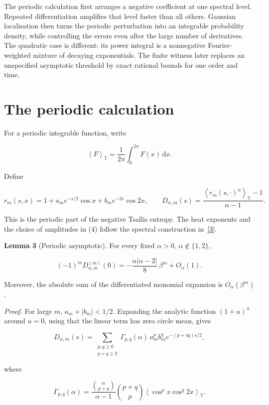 \documentclass[
  11pt,
]{article}
\begin{document}
The periodic calculation first arranges a negative coefficient at one
spectral level. Repeated differentiation amplifies that level faster
than all others. Gaussian localisation then turns the periodic
perturbation into an integrable probability density, while controlling
the errors even after the large number of derivatives. The quadratic
case is different: its power integral is a nonnegative Fourier-weighted
mixture of decaying exponentials. The finite witness later replaces an
unspecified asymptotic threshold by exact rational bounds for one order
and time.

\section{The periodic calculation}\label{the-periodic-calculation}

For a periodic integrable function, write

\[
\left\langle F\right\rangle_{\mathbb T}=\frac1{2\pi}\int_0^{2\pi}F(x)\,\mathrm dx.
\]

Define

\[
\tag{9}
 r_m(s,x)=1+a_me^{-s/2}\cos x+b_me^{-2s}\cos2x,
 \qquad
 D_{\alpha,m}(s)=\frac{\left\langle r_m(s,\cdot)^\alpha\right\rangle_{\mathbb T}-1}{\alpha-1}.
\]

This is the periodic part of the negative Tsallis entropy. The heat
exponents and the choice of amplitudes in (4) follow the spectral
construction in~\href{https://arxiv.org/abs/2608.30275v1}{{[}3{]}}.

\textbf{Lemma 3} (Periodic asymptotic). For every fixed \(\alpha>0\),
\(\alpha\notin\{1,2\}\),

\[
\tag{10}
 (-1)^mD_{\alpha,m}^{(m)}(0)
 =-\frac{\alpha|\alpha-2|}{8}\,\beta^m+O_\alpha(1).
\]

Moreover, the absolute sum of the differentiated monomial expansion is
\(O_\alpha(\beta^m)\).

\emph{Proof.} For large \(m\), \(a_m+|b_m|<1/2\). Expanding the analytic
function \((1+u)^\alpha\) around \(u=0\), using that the linear term has
zero circle mean, gives

\[
\tag{11}
 D_{\alpha,m}(s)=
 \sum_{\substack{p,q\geq0\\p+q\geq2}}
  \Gamma_{p,q}(\alpha)\,a_m^p b_m^q e^{-(p+4q)s/2},
\]

where

\[
\tag{12}
 \Gamma_{p,q}(\alpha)=
 \frac{\binom\alpha{p+q}}{\alpha-1}
 \binom{p+q}{p}\left\langle \cos^p x\cos^q2x\right\rangle_{\mathbb T}.
\]
\end{document}
